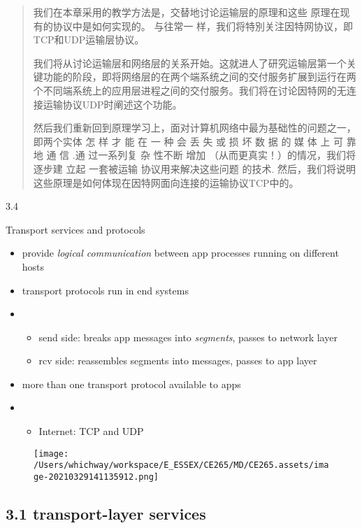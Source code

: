 \documentclass[
]{article}
\begin{document}
\begin{quote}
我们在本章采用的教学方法是，交替地讨论运输层的原理和这些
原理在现有的协议中是如何实现的。 与往常一
样，我们将特別关注因特网协议，即TCP和UDP运输层协议。

我们将从讨论运输层和网络层的关系开始。这就进人了研究运输层第一个关键功能的阶段，即将网络层的在两个端系统之间的交付服务扩展到运行在两个不同端系统上的应用层进程之间的交付服务。我们将在讨论因特网的无连接运输协议UDP时阐述这个功能。

然后我们重新回到原理学习上，面对计算机网络中最为基础性的问题之一，即两个实体
怎 样 才 能 在 一 种 会 丢 失 或 损 坏 数 据 的 媒 体 上 可 靠 地 通 信
.通 过一系列复 杂 性不断 增加 （从而更真实！）的情况，我们将逐步建 立起
一套被运输 协议用来解决这些问题 的技术.
然后，我们将说明这些原理是如何体现在因特网面向连接的运输协议TCP中的。
\end{quote}

3.4

Transport services and protocols

\begin{itemize}
\item
  provide \emph{logical communication} between app processes running on
  different hosts
\item
  transport protocols run in end systems
\item
  \begin{itemize}
  \item
    send side: breaks app messages into \emph{segments}, passes to
    network layer
  \item
    rcv side: reassembles segments into messages, passes to app layer
  \end{itemize}
\item
  more than one transport protocol available to apps
\item
  \begin{itemize}
  \item
    Internet: TCP and UDP
  \end{itemize}
\end{itemize}

\begin{figure}
\centering
\texttt{[image: /Users/whichway/workspace/E\_ESSEX/CE265/MD/CE265.assets/image-20210329141135912.png]}
\caption{}
\end{figure}

\hypertarget{31-transport-layer-services}{%
\subsection{3.1 transport-layer
services}\label{31-transport-layer-services}}
\end{document}

